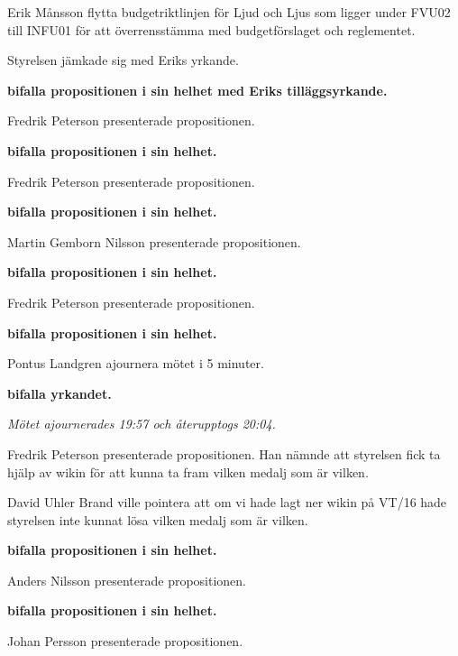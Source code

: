 \documentclass[10pt]{article}
\begin{document}
\begin{paragrafer}
\begin{paragrafer}
        Erik Månsson \ypa flytta budgetriktlinjen för Ljud och Ljus som ligger under FVU02 till INFU01 för att överrensstämma med budgetförslaget och reglementet.

        Styrelsen jämkade sig med Eriks yrkande.

        \textbf{\Mba bifalla propositionen i sin helhet med Eriks tilläggsyrkande.}

        Fredrik Peterson presenterade propositionen.

        \textbf{\Mba bifalla propositionen i sin helhet.}

        Fredrik Peterson presenterade propositionen.

        \textbf{\Mba bifalla propositionen i sin helhet.}

        Martin Gemborn Nilsson presenterade propositionen.

        \textbf{\Mba bifalla propositionen i sin helhet.}

        Fredrik Peterson presenterade propositionen.

        \textbf{\Mba bifalla propositionen i sin helhet.}

        Pontus Landgren \ypa ajournera mötet i 5 minuter.

        \textbf{\Mba bifalla yrkandet.}

        \emph{Mötet ajournerades 19:57 och återupptogs 20:04.}

        Fredrik Peterson presenterade propositionen. Han nämnde att styrelsen fick ta hjälp av wikin för att kunna ta fram vilken medalj som är vilken.

        David Uhler Brand ville pointera att om vi hade lagt ner wikin på VT/16 hade styrelsen inte kunnat lösa vilken medalj som är vilken.

        \textbf{\Mba bifalla propositionen i sin helhet.}

        Anders Nilsson presenterade propositionen.

        \textbf{\Mba bifalla propositionen i sin helhet.}

        Johan Persson presenterade propositionen.


\end{paragrafer}
\end{paragrafer}
\end{document}
